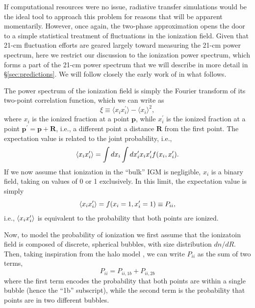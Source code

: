 If computational resources were no issue, radiative transfer simulations would be the ideal tool to approach this problem for reasons that will be apparent momentarily. However, once again, the two-phase approximation opens the door to a simple statistical treatment of fluctuations in the ionization field. Given that 21-cm fluctuation efforts are geared largely toward measuring the 21-cm power spectrum, here we restrict our discussion to the ionization power spectrum, which forms a part of the 21-cm power spectrum that we will describe in more detail in \S\ref{sec:predictions}. We will follow closely the early work of \cite{Furlanetto2004} in what follows.

The power spectrum of the ionization field is simply the Fourier transform of its two-point correlation function, which we can write as
\begin{equation}
	\xi \equiv \langle x_i x_i^{\prime} \rangle - \langle x_i \rangle^2 ,
\end{equation}
where $x_i$ is the ionized fraction at a point $\mathbf{p}$, while $x_i^{\prime}$ is the ionized fraction at a point $\mathbf{p}^{\prime} = \mathbf{p} + \mathbf{R}$, i.e., a different point a distance $\mathbf{R}$ from the first point. The expectation value is related to the joint probability, i.e.,
\begin{equation}
	\langle x_i x_i^{\prime} \rangle = \int dx_i \int dx_i^{\prime} x_i x_i^{\prime} f(x_i, x_i^{\prime}) .
\end{equation}
If we now assume that ionization in the ``bulk'' IGM is negligible, $x_i$ is a binary field, taking on values of 0 or 1 exclusively. In this limit, the expectation value is simply
\begin{equation}
	\langle x_i x_i^{\prime} \rangle = f(x_i=1, x_i^{\prime}=1) \equiv P_{ii} ,
\end{equation}
i.e., $\langle x_i x_i^{\prime} \rangle$ is equivalent to the probability that both points are ionized. 

Now, to model the probability of ionization we first assume that the ionizatoin field is composed of discrete, spherical bubbles, with size distribution $dn/dR$. Then, taking inspiration from the halo model \cite{Cooray2002}, we can write $P_{ii}$ as the sum of two terms,
\begin{equation}
	P_{ii} = P_{ii,1b} + P_{ii,2b}
\end{equation}
where the first term encodes the probability that both points are within a single bubble (hence the ``1b'' subscript), while the second term is the probability that points are in two different bubbles. 

